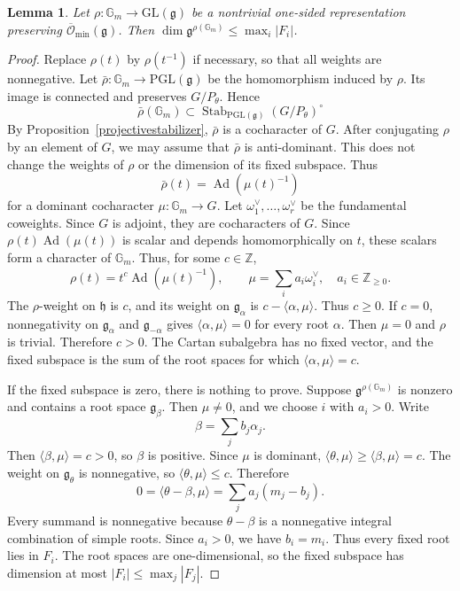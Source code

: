 \documentclass[10pt,a4paper]{amsart}
\newtheorem{lemma}[theorem]{Lemma}
\DeclareMathOperator{\Ad}{Ad}
\DeclareMathOperator{\Stab}{Stab}
\newcommand{\Gm}{\mathbb G_m}
\newcommand{\GL}{\mathrm{GL}}
\newcommand{\PGL}{\mathrm{PGL}}
\newcommand{\Lieg}{\mathfrak{g}}
\newcommand{\h}{\mathfrak h}
\newcommand{\Ominbar}{\overline{\mathcal O}_{\min}}
\begin{document}
\begin{lemma}\label{onesided}
    Let $\rho:\Gm\to\GL(\Lieg)$ be a nontrivial one-sided representation preserving $\Ominbar(\Lieg)$. Then $\dim\Lieg^{\rho(\Gm)}\le\max_i|F_i|$.
\end{lemma}
\begin{proof}
    Replace $\rho(t)$ by $\rho(t^{-1})$ if necessary, so that all weights are nonnegative. Let $\bar\rho:\Gm\to\PGL(\Lieg)$ be the homomorphism induced by $\rho$. Its image is connected and preserves $G/P_\theta$. Hence
    \[
        \bar\rho(\Gm)\subset
        \Stab_{\PGL(\Lieg)}(G/P_\theta)^\circ
    \]
    By Proposition~\ref{projectivestabilizer}, $\bar\rho$ is a cocharacter of $G$. After conjugating $\rho$ by an element of $G$, we may assume that $\bar\rho$ is anti-dominant. This does not change the weights of $\rho$ or the dimension of its fixed subspace. Thus
    \[
        \bar\rho(t)=\Ad(\mu(t)^{-1})
    \]
    for a dominant cocharacter $\mu:\Gm\to G$. Let $\omega_1^\vee,\ldots,\omega_r^\vee$ be the fundamental coweights. Since $G$ is adjoint, they are cocharacters of $G$.
    Since $\rho(t)\Ad(\mu(t))$ is scalar and depends homomorphically on $t$, these scalars form a character of $\Gm$. Thus, for some $c\in\mathbb Z$,
    \[
        \rho(t)=t^c\Ad(\mu(t)^{-1}),\qquad
        \mu=\sum_i a_i\omega_i^\vee,\quad a_i\in\mathbb Z_{\ge0}.
    \]
    The $\rho$-weight on $\h$ is $c$, and its weight on $\Lieg_\alpha$ is $c-\langle\alpha,\mu\rangle$. Thus $c\ge0$. If $c=0$, nonnegativity on $\Lieg_\alpha$ and $\Lieg_{-\alpha}$ gives $\langle\alpha,\mu\rangle=0$ for every root $\alpha$. Then $\mu=0$ and $\rho$ is trivial. 
    Therefore $c>0$. The Cartan subalgebra has no fixed vector, and the fixed subspace is the sum of the root spaces for which $\langle\alpha,\mu\rangle=c$.

    If the fixed subspace is zero, there is nothing to prove. Suppose $\Lieg^{\rho(\Gm)}$ is nonzero and contains a root space $\Lieg_\beta$. Then $\mu\neq 0$, and we choose $i$ with $a_i>0$. Write $$\beta=\sum_j b_j\alpha_j.$$ Then $\langle\beta,\mu\rangle=c>0$, so $\beta$ is positive. Since $\mu$ is dominant, $\langle\theta,\mu\rangle\ge\langle\beta,\mu\rangle=c$. The weight on $\Lieg_\theta$ is nonnegative, so $\langle\theta,\mu\rangle\le c$. Therefore
    \[
        0=\langle\theta-\beta,\mu\rangle
        =\sum_j a_j(m_j-b_j).
    \]
    Every summand is nonnegative because $\theta-\beta$ is a nonnegative integral combination of simple roots. Since $a_i>0$, we have $b_i=m_i$. Thus every fixed root lies in $F_i$. The root spaces are one-dimensional, so the fixed subspace has dimension at most $|F_i|\le\max_j|F_j|$.
\end{proof}
\end{document}

